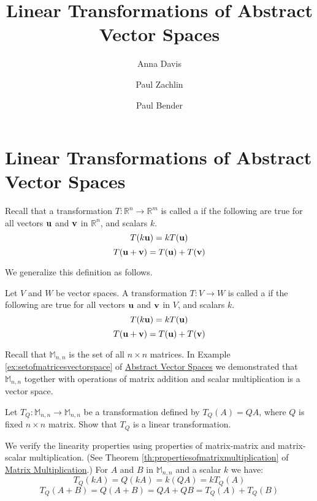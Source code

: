 \documentclass{ximera}
\author{Anna Davis \and Paul Zachlin \and Paul Bender} \title{Linear Transformations of Abstract Vector Spaces} \license{CC-BY 4.0}
\begin{document}
\begin{abstract}
\end{abstract}
\maketitle

\section*{Linear Transformations of Abstract Vector Spaces}

Recall that a transformation $T:\mathbb{R}^n\rightarrow \mathbb{R}^m$ is called a  if the following are true for all vectors ${\bf u}$ and ${\bf v}$ in $\mathbb{R}^n$, and scalars $k$.
\begin{equation*}
T(k{\bf u})= kT({\bf u})
\end{equation*}
\begin{equation*}
T({\bf u}+{\bf v})= T({\bf u})+T({\bf v})
\end{equation*}

We generalize this definition as follows.

\begin{definition}\label{def:lintransgeneral}
Let $V$ and $W$ be vector spaces. A transformation $T:V\rightarrow W$ is called a  if the following are true for all vectors ${\bf u}$ and ${\bf v}$ in $V$, and scalars $k$.
\begin{equation*}
T(k{\bf u})= kT({\bf u})
\end{equation*}
\begin{equation*}
T({\bf u}+{\bf v})= T({\bf u})+T({\bf v})
\end{equation*}
\end{definition}

\begin{example}\label{ex:abstvectsplintransM22}
Recall that $\mathbb{M}_{n,n}$ is the set of all $n\times n$ matrices.  In Example \ref{ex:setofmatricesvectorspace} of \href{https://ximera.osu.edu/oerlinalg/LinearAlgebra/VSP-0050/main}{Abstract Vector Spaces} we demonstrated that $\mathbb{M}_{n,n}$ together with operations of matrix addition and scalar multiplication is a vector space.

Let $T_Q:\mathbb{M}_{n,n}\rightarrow \mathbb{M}_{n,n}$ be a transformation defined by $T_Q(A)=QA$, where $Q$ is fixed $n\times n$ matrix.  Show that $T_Q$ is a linear transformation.
\begin{explanation}
We verify the linearity properties using properties of matrix-matrix and matrix-scalar multiplication.  (See Theorem \ref{th:propertiesofmatrixmultiplication} of \href{https://ximera.osu.edu/oerlinalg/LinearAlgebra/MAT-0020/main}{Matrix Multiplication}.)  For $A$ and $B$ in $\mathbb{M}_{n,n}$ and a scalar $k$ we have:
$$T_Q(kA)=Q(kA)=k(QA)=kT_Q(A)$$
$$T_Q(A+B)=Q(A+B)=QA+QB=T_Q(A)+T_Q(B)$$
\end{explanation}
\end{example}
\end{document}
